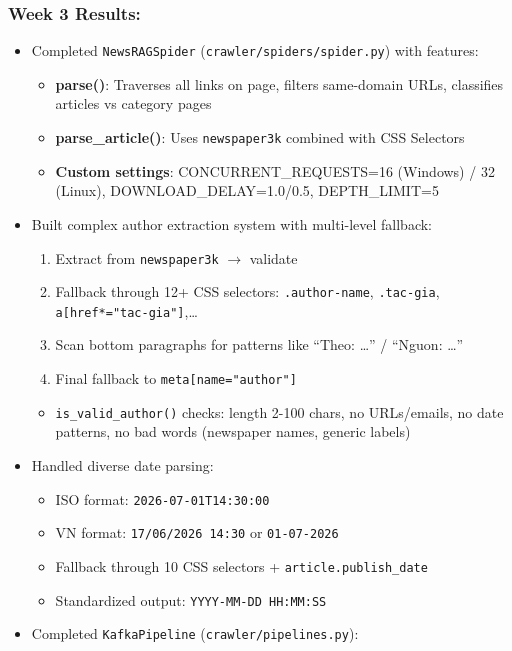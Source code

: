 \hypertarget{week-3-results}{%
\subsubsection{Week 3 Results:}}

\begin{itemize}
\tightlist
\item
  Completed \texttt{NewsRAGSpider} (\texttt{crawler/spiders/spider.py})
  with features:

  \begin{itemize}
  \tightlist
  \item
    \textbf{parse()}: Traverses all links on page, filters same-domain
    URLs, classifies articles vs category pages
  \item
    \textbf{parse\_article()}: Uses \texttt{newspaper3k} combined with
    CSS Selectors
  \item
    \textbf{Custom settings}: CONCURRENT\_REQUESTS=16 (Windows) / 32
    (Linux), DOWNLOAD\_DELAY=1.0/0.5, DEPTH\_LIMIT=5
  \end{itemize}
\item
  Built complex author extraction system with multi-level fallback:

  \begin{enumerate}
  \def\labelenumi{\arabic{enumi}.}
  \tightlist
  \item
    Extract from \texttt{newspaper3k} \(\rightarrow\) validate
  \item
    Fallback through 12+ CSS selectors: \texttt{.author-name},
    \texttt{.tac-gia}, \texttt{a{[}href*="tac-gia"{]}},\ldots{}
  \item
    Scan bottom paragraphs for patterns like ``Theo: \ldots{}'' /
    ``Nguon: \ldots{}''
  \item
    Final fallback to \texttt{meta{[}name="author"{]}}
  \end{enumerate}

  \begin{itemize}
  \tightlist
  \item
    \texttt{is\_valid\_author()} checks: length 2-100 chars, no
    URLs/emails, no date patterns, no bad words (newspaper names,
    generic labels)
  \end{itemize}
\item
  Handled diverse date parsing:

  \begin{itemize}
  \tightlist
  \item
    ISO format: \texttt{2026-07-01T14:30:00}
  \item
    VN format: \texttt{17/06/2026\ 14:30} or \texttt{01-07-2026}
  \item
    Fallback through 10 CSS selectors + \texttt{article.publish\_date}
  \item
    Standardized output: \texttt{YYYY-MM-DD\ HH:MM:SS}
  \end{itemize}
\item
  Completed \texttt{KafkaPipeline} (\texttt{crawler/pipelines.py}):


\end{itemize}

